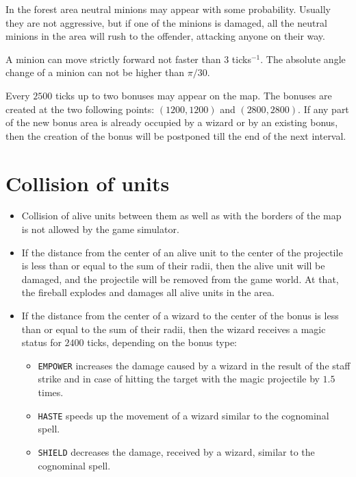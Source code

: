 In the forest area neutral minions may appear with some probability. Usually they are not aggressive, but if one of the minions is damaged,
all the neutral minions in the area will rush to the offender, attacking anyone on their way.

A minion can move strictly forward not faster than $3$ ticks$^{-1}$. The absolute angle change of a minion can not be higher than $\pi / 30$.
 
Every $2500$ ticks up to two bonuses may appear on the map. The bonuses are created at the two following points: $(1200, 1200)$ and
$(2800, 2800)$. If any part of the new bonus area is already occupied by a wizard or by an existing bonus, then the creation of the bonus
will be postponed till the end of the next interval.
 
\section{Collision of units}

\begin{itemize}
 \item Collision of alive units between them as well as with the borders of the map is not allowed by the game simulator.
 \item If the distance from the center of an alive unit to the center of the projectile is less than or equal to the sum of their radii, then the alive unit will be damaged, and the projectile
            will be removed from the game world. At that, the fireball explodes and damages all alive units in the area.
 \item If the distance from the center of a wizard to the center of the bonus is less than or equal to the sum of their radii, then the wizard receives a magic status
            for $2400$ ticks, depending on the bonus type:
            \begin{itemize}
            \item \texttt{EMPOWER} increases the damage caused by a wizard in the result of the staff strike and in case of hitting the target
                    with the magic projectile by $1.5$ times.
            \item \texttt{HASTE} speeds up the movement of a wizard similar to the cognominal spell.
            \item \texttt{SHIELD} decreases the damage, received by a wizard, similar to the cognominal spell.
            \end{itemize}
\end{itemize}
 
